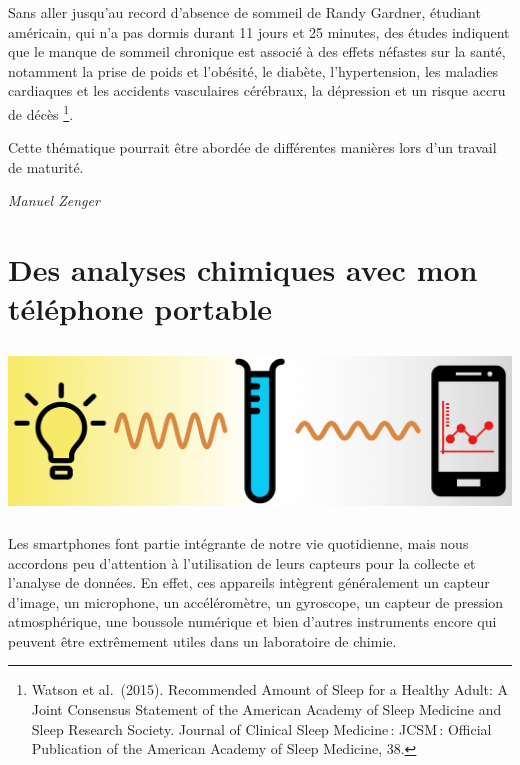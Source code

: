 \documentclass[
  10pt,
  french,
  a5paper,
  openany]{book}
\newenvironment{signature}{\begin{flushright}}{\end{flushright}}
\begin{document}
Sans aller jusqu'au record d'absence de sommeil de Randy Gardner, étudiant américain, qui n'a pas dormis durant 11 jours et 25 minutes, des études indiquent que le manque de sommeil chronique est associé à des effets néfastes sur la santé, notamment la prise de poids et l'obésité, le diabète, l'hypertension, les maladies cardiaques et les accidents vasculaires cérébraux, la dépression et un risque accru de décès \footnote{Watson et al.~(2015). Recommended Amount of Sleep for a Healthy Adult: A Joint Consensus Statement of the American Academy of Sleep Medicine and Sleep Research Society. Journal of Clinical Sleep Medicine\,: JCSM\,: Official Publication of the American Academy of Sleep Medicine, 38.}.

Cette thématique pourrait être abordée de différentes manières lors d'un travail de maturité.

\begin{signature}
\emph{Manuel Zenger}

\end{signature}

\hypertarget{des-analyses-chimiques-avec-mon-tuxe9luxe9phone-portable}{%
\chapter{\texorpdfstring{Des analyses chimiques \linebreak avec mon téléphone portable}{Des analyses chimiques avec mon téléphone portable}}\label{des-analyses-chimiques-avec-mon-tuxe9luxe9phone-portable}}

\begin{center}
\includegraphics[width=\textwidth,height=12em]{images/analyses-chimiques-telephone-portable.jpg}

\end{center}

Les smartphones font partie intégrante de notre vie quotidienne, mais nous accordons peu d'attention à l'utilisation de leurs capteurs pour la collecte et l'analyse de données. En effet, ces appareils intègrent généralement un capteur d'image, un microphone, un accéléromètre, un gyroscope, un capteur de pression atmosphérique, une boussole numérique et bien d'autres instruments encore qui peuvent être extrêmement utiles dans un laboratoire de chimie.
\end{document}
